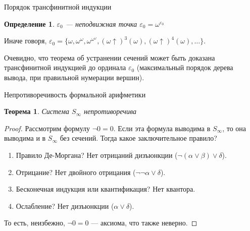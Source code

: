 \documentclass[aspectratio=169]{beamer}
\newtheorem{thm}{Теорема}[section]
\newtheorem{dfn}{Определение}[section]
\begin{document}
\begin{frame}{Порядок трансфинитной индукции}
\begin{dfn}$\varepsilon_0$ --- неподвижная точка $\varepsilon_0 = \omega^{\varepsilon_0}$\end{dfn}

Иначе говоря, $\varepsilon_0 = \{ \omega, \omega^\omega, \omega^{\omega^\omega}, (\omega \uparrow)^3(\omega), (\omega\uparrow)^4(\omega), \dots \}$.

Очевидно, что теорема об устранении сечений может быть доказана трансфинитной индукцией до ординала $\varepsilon_0$
(максимальный порядок дерева вывода, при правильной нумерации вершин).
\end{frame}

\begin{frame}{Непротиворечивость формальной арифметики}
\begin{thm}Система $S_\infty$ непротиворечива\end{thm}
\begin{proof} \pause
Рассмотрим формулу $\neg 0=0$. 
Если эта формула выводима в $S_\infty$, то она выводима и в $S_\infty$ без сечений.
Тогда какое заключительное правило? \pause
\begin{enumerate}
\item Правило Де-Моргана? \pause Нет отрицаний дизъюнкции ($\neg(\alpha\vee\beta)\vee\delta$). \pause
\item Отрицание? \pause Нет двойного отрицания ($\neg\neg\alpha\vee\delta$). \pause
\item Бесконечная индукция или квантификация? \pause Нет квантора. \pause
\item Ослабление? \pause Нет дизъюнкции ($\alpha \vee \delta$). \pause
\end{enumerate}

То есть, неизбежно, $\neg 0=0$ --- аксиома, что также неверно.
\end{proof}
\end{frame}
\end{document}

